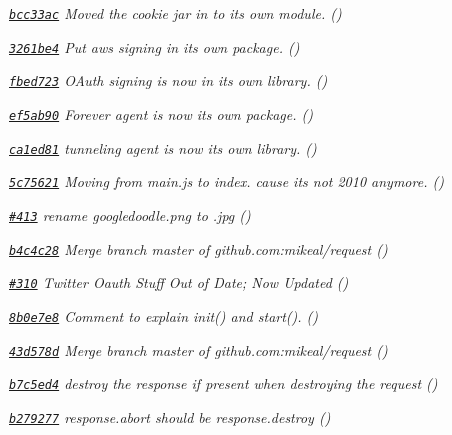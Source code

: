 \begin{DoxyItemize}
\item {\itshape \href{https://github.com/mikeal/request/commit/bcc33aca57baf6fe2a81fbf5983048c9220c71b1}{\tt bcc33ac} Moved the cookie jar in to it\textquotesingle{}s own module. ()}
\item {\itshape \href{https://github.com/mikeal/request/commit/3261be4b5d6f45f62b9f50bec18af770cbb70957}{\tt 3261be4} Put aws signing in its own package. ()}
\item {\itshape \href{https://github.com/mikeal/request/commit/fbed7234d7b532813105efdc4c54777396a6773b}{\tt fbed723} O\+Auth signing is now in its own library. ()}
\item {\itshape \href{https://github.com/mikeal/request/commit/ef5ab90277fb00d0e8eb1c565b0f6ef8c52601d3}{\tt ef5ab90} Forever agent is now it\textquotesingle{}s own package. ()}
\item {\itshape \href{https://github.com/mikeal/request/commit/ca1ed813c62c7493dc77108b3efc907cc36930cb}{\tt ca1ed81} tunneling agent is now it\textquotesingle{}s own library. ()}
\item {\itshape \href{https://github.com/mikeal/request/commit/5c75621ba5cea18bcf114117112121d361e5f3c9}{\tt 5c75621} Moving from main.\+js to index. cause it\textquotesingle{}s not 2010 anymore. ()}
\item {\itshape \href{https://github.com/mikeal/request/pull/413}{\tt \#413} rename googledoodle.\+png to .jpg ()}
\item {\itshape \href{https://github.com/mikeal/request/commit/b4c4c28424d906cd96a2131010b21d7facf8b666}{\tt b4c4c28} Merge branch \textquotesingle{}master\textquotesingle{} of github.\+com\+:mikeal/request ()}
\item {\itshape \href{https://github.com/mikeal/request/pull/310}{\tt \#310} Twitter Oauth Stuff Out of Date; Now Updated ()}
\item {\itshape \href{https://github.com/mikeal/request/commit/8b0e7e8c9d196d7286d1563aa54affcc4c8b0e1d}{\tt 8b0e7e8} Comment to explain init() and start(). ()}
\item {\itshape \href{https://github.com/mikeal/request/commit/43d578dc0206388eeae9584f540d550a06308fc8}{\tt 43d578d} Merge branch \textquotesingle{}master\textquotesingle{} of github.\+com\+:mikeal/request ()}
\item {\itshape \href{https://github.com/mikeal/request/commit/b7c5ed48b618f71f138f9f08f8d705336f907e01}{\tt b7c5ed4} destroy the response if present when destroying the request ()}
\item {\itshape \href{https://github.com/mikeal/request/commit/b279277dc2fb4b649640322980315d74db0d13f3}{\tt b279277} response.\+abort should be response.\+destroy ()}

\end{DoxyItemize}
